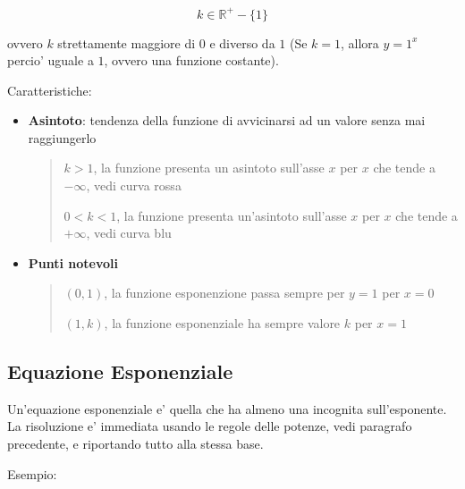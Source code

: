 \documentclass{article}
\begin{document}
{{    $$ k \in \mathbb{R}^+ - \{1\} $$

    ovvero $ k $ strettamente maggiore di $ 0 $ e diverso da $ 1 $ \small{(Se $ k = 1 $, allora $ y = 1^x $ percio' uguale a $ 1 $, ovvero una funzione costante)}.

  }

  Caratteristiche:
  \begin{itemize}
    \item \textbf{Asintoto}: tendenza della funzione di avvicinarsi ad un valore senza mai raggiungerlo
    \begin{quote}
      $ k > 1 $, la funzione presenta un asintoto sull'asse $ x $ per $ x $ che tende a $ -\infty $, vedi curva rossa

      $ 0 < k < 1 $, la funzione presenta un'asintoto sull'asse $ x $ per $ x $ che tende a $ +\infty $, vedi curva blu
    \end{quote}
    \item \textbf{Punti notevoli}
    \begin{quote}
      $ (0,1) $, la funzione esponenzione passa sempre per $ y = 1 $ per $ x = 0 $

      $ (1,k) $, la funzione esponenziale ha sempre valore $ k $ per $ x = 1 $
    \end{quote}
  \end{itemize}

  \pagebreak

  \subsection{Equazione Esponenziale}
  Un'equazione esponenziale e' quella che ha almeno una incognita sull'esponente. La risoluzione e' immediata usando le regole delle potenze, vedi paragrafo precedente, e riportando tutto alla stessa base.

  Esempio:

}
\end{document}
